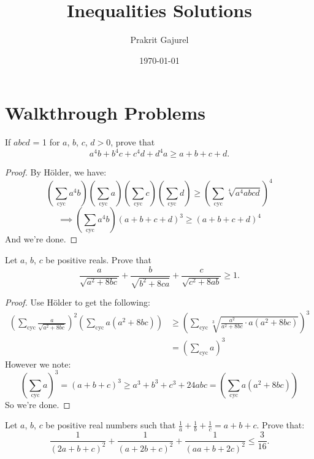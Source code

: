 \documentclass[11pt]{scrartcl}
\begin{document}
\title{Inequalities Solutions}
\author{Prakrit Gajurel}
\date{\today}
\maketitle

\section{Walkthrough Problems}

\begin{problem}
If $abcd$ = 1 for $a$, $b$, $c$, $d > 0$, prove that
\[
a^4b + b^4c + c^4d + d^4a \ge a + b + c + d.
\]
\end{problem}

\begin{proof}
    By Hölder, we have:
    \[
    \left( \sum_{\text{cyc}} a^4b \right) \left( \sum_{\text{cyc}} a \right) \left( \sum_{\text{cyc}} c \right) \left( \sum_{\text{cyc}} d \right)
    \ge
    \left( \sum_{\text{cyc}} \sqrt[4]{a^4 abcd} \right)^4
    \]
    \[
    \implies \left( \sum_{\text{cyc}} a^4b \right) (a+b+c+d)^3 \ge (a+b+c+d)^4
    \]
    And we're done.
\end{proof}

\begin{problem}
  [IMO 2001]
  Let $a$, $b$, $c$ be positive reals. Prove that
  \[
  \frac{a}{\sqrt{a^2 + 8bc}} + \frac{b}{\sqrt{b^2 + 8ca}} + \frac{c}{\sqrt{c^2 + 8ab}} \ge 1.
  \]
\end{problem}

\begin{proof}
  Use Hölder to get the following:
  \begin{align*}
    \left( \sum_{\text{cyc}} \frac{a}{\sqrt{a^2 + 8bc}} \right)^2 \left( \sum_{\text{cyc}} a(a^2 + 8bc) \right)
    &\ge
    \left( \sum_{\text{cyc}} \sqrt[3]{\frac{a^2}{a^2 + 8bc} \cdot a(a^2 + 8bc)} \right)^3 \\
    &= \left( \sum_{\text{cyc}} a \right)^3
  \end{align*}
  However we note:
  \[
  \left( \sum_{\text{cyc}} a \right)^3 = (a + b + c)^3 \ge a^3 + b^3 + c^3 + 24abc = \left( \sum_{\text{cyc}} a(a^2 + 8bc) \right)
  \]
  So we're done.
\end{proof}

\begin{problem}
  Let $a$, $b$, $c$ be positive real numbers such that $\frac1a + \frac1b + \frac1c = a + b + c$. Prove that:
  \[
  \frac{1}{(2a+b+c)^2} + \frac{1}{(a+2b+c)^2} + \frac{1}{(aa+b+2c)^2} \le \frac{3}{16}.
  \]
\end{problem}
\end{document}
